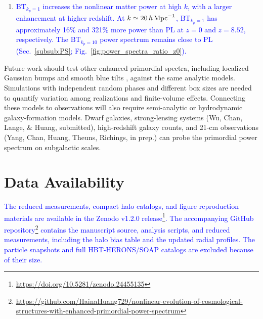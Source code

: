 \documentclass[
 reprint,
 superscriptaddress,
 nofootinbib,
 nobibnotes,
 amsmath,
 amssymb,
 aps,
 prd,
 floatfix,
 longbibliography
]{revtex4-2}
\DeclareRobustCommand{\change}[1]{\textcolor{blue}{#1}}
\DeclareRobustCommand{\BTKPone}{\ensuremath{\mathrm{BT}_{k_p=1}}}
\DeclareRobustCommand{\BTKPten}{\ensuremath{\mathrm{BT}_{k_p=10}}}
\begin{document}
\begin{enumerate}
    For the \(0.25\)-dex mass bins lying wholly above \(M_{200c}=1.89\times10^9\,M_\odot\) and containing at least 20 halos, the Diemer \& Joyce (2019) concentration-mass relation agrees with the simulation medians within \(20\%\) for PL, \BTKPone{}, and \BTKPten{} at all four redshifts (Sec.~\ref{subsub:concentration}) \citep{Diemer2019}.


    \item \change{\BTKPone{} increases the nonlinear matter power at high \(k\), with a larger enhancement at higher redshift. At \(k\simeq20\,h\,{\rm Mpc}^{-1}\), \BTKPone{} has approximately 16\% and 321\% more power than PL at \(z=0\) and \(z=8.52\), respectively. The \BTKPten{} power spectrum remains close to PL (Sec.~\ref{subsub:PS}; Fig.~\ref{fig:power_spectra_ratio_z0}).}
\end{enumerate}


Future work should test other enhanced primordial spectra, including localized Gaussian bumps \citep{Tkac24BumpyPPS} and smooth blue tilts \citep{2026arXiv260522161K}, against the same analytic models. Simulations with independent random phases and different box sizes are needed to quantify variation among realizations and finite-volume effects. Connecting these models to observations will also require semi-analytic or hydrodynamic galaxy-formation models. Dwarf galaxies, strong-lensing systems (Wu, Chan, Lange, \& Huang, submitted), high-redshift galaxy counts, and 21-cm observations (Yang, Chan, Huang, Theuns, Richings, in prep.) can probe the primordial power spectrum on subgalactic scales.

\section*{Data Availability}


\change{The reduced measurements, compact halo catalogs, and figure reproduction materials are available in the Zenodo v1.2.0 release\footnote{\url{https://doi.org/10.5281/zenodo.24455135}}. The accompanying GitHub repository\footnote{\url{https://github.com/HainaHuang729/nonlinear-evolution-of-cosmological-structures-with-enhanced-primordial-power-spectrum}} contains the manuscript source, analysis scripts, and reduced measurements, including the halo bias table and the updated radial profiles. The particle snapshots and full \textsc{HBT-HERONS}/\textsc{SOAP} catalogs are excluded because of their size.}
\end{document}
